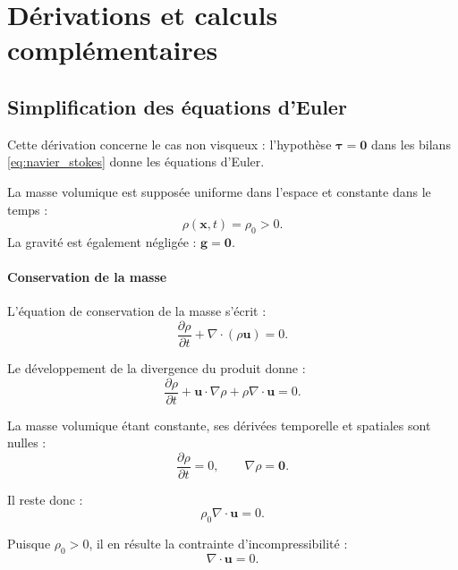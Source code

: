 \section{Dérivations et calculs complémentaires}
\label{annexes:details_calculs}

\subsection{Simplification des équations d'Euler}
Cette dérivation concerne le cas non visqueux : l'hypothèse
$\boldsymbol{\tau} = \mathbf{0}$ dans les bilans
\eqref{eq:navier_stokes} donne les équations d'Euler.

La masse volumique est supposée uniforme dans l'espace
et constante dans le temps :
\begin{equation}
    \rho(\mathbf{x}, t) = \rho_0 > 0.
\end{equation}
La gravité est également négligée : $\mathbf{g} = \mathbf{0}$.

\paragraph*{Conservation de la masse}

L'équation de conservation de la masse s'écrit :
\begin{equation}
    \frac{\partial \rho}{\partial t}
    + \nabla \cdot (\rho \mathbf{u}) = 0.
\end{equation}

Le développement de la divergence du produit donne :
\begin{equation}
    \frac{\partial \rho}{\partial t}
    + \mathbf{u} \cdot \nabla \rho
    + \rho \nabla \cdot \mathbf{u} = 0.
\end{equation}

La masse volumique étant constante, ses dérivées temporelle
et spatiales sont nulles :
\begin{equation}
    \frac{\partial \rho}{\partial t} = 0,
    \qquad
    \nabla \rho = \mathbf{0}.
\end{equation}

Il reste donc :
\begin{equation}
    \rho_0 \nabla \cdot \mathbf{u} = 0.
\end{equation}

Puisque $\rho_0 > 0$, il en résulte la contrainte
d'incompressibilité :
\begin{equation}
    \boxed{\nabla \cdot \mathbf{u} = 0.}
\end{equation}

